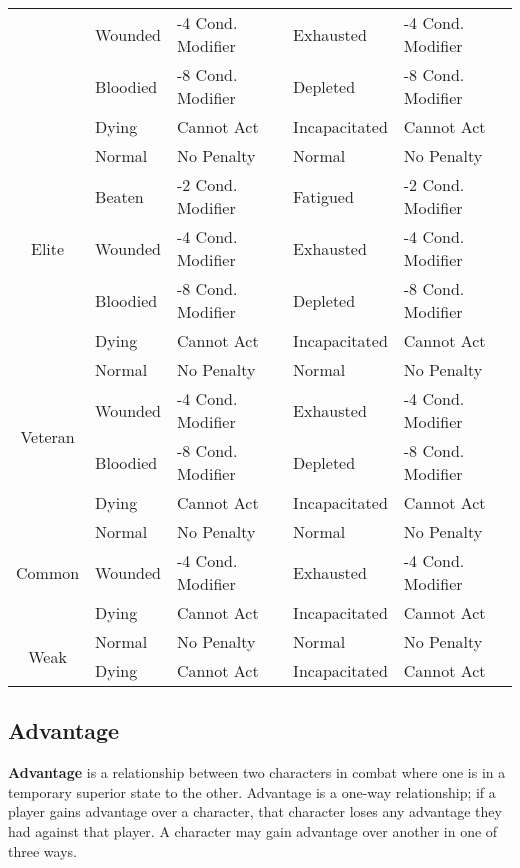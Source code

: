 \documentclass[11pt]{article}
\begin{document}
\begin{center}
\begin{tabular}{|c|ll|ll|}
		 & Wounded  & -4  Cond. Modifier & Exhausted     & -4  Cond. Modifier \\
		 & Bloodied & -8  Cond. Modifier & Depleted      & -8  Cond. Modifier \\
		 & Dying    & Cannot Act              & Incapacitated & Cannot Act              \\
		\hline
		\multirow{5}{*}{Elite}
		 & Normal   & No Penalty              & Normal        & No Penalty              \\
		 & Beaten   & -2  Cond. Modifier & Fatigued      & -2  Cond. Modifier \\
		 & Wounded  & -4  Cond. Modifier & Exhausted     & -4  Cond. Modifier \\
		 & Bloodied & -8  Cond. Modifier & Depleted      & -8  Cond. Modifier \\
		 & Dying    & Cannot Act              & Incapacitated & Cannot Act              \\
		\hline
		\multirow{4}{*}{Veteran}
		 & Normal   & No Penalty              & Normal        & No Penalty              \\
		 & Wounded  & -4  Cond. Modifier & Exhausted     & -4  Cond. Modifier \\
		 & Bloodied & -8  Cond. Modifier & Depleted      & -8  Cond. Modifier \\
		 & Dying    & Cannot Act              & Incapacitated & Cannot Act              \\
		\hline
		\multirow{3}{*}{Common}
		 & Normal   & No Penalty              & Normal        & No Penalty              \\
		 & Wounded  & -4  Cond. Modifier & Exhausted     & -4  Cond. Modifier \\
		 & Dying    & Cannot Act              & Incapacitated & Cannot Act              \\
		\hline
		\multirow{2}{*}{Weak}
		 & Normal   & No Penalty              & Normal        & No Penalty              \\
		 & Dying    & Cannot Act              & Incapacitated & Cannot Act              \\
		\hline
	\end{tabular}
\end{center}
\newpage

\subsection{Advantage}
\textbf{Advantage} is a relationship between two characters in combat where one is in a temporary superior state to the other.
Advantage is a one-way relationship; if a player gains advantage over a character, that character loses any advantage they had against that player.
A character may gain advantage over another in one of three ways.
\end{document}
